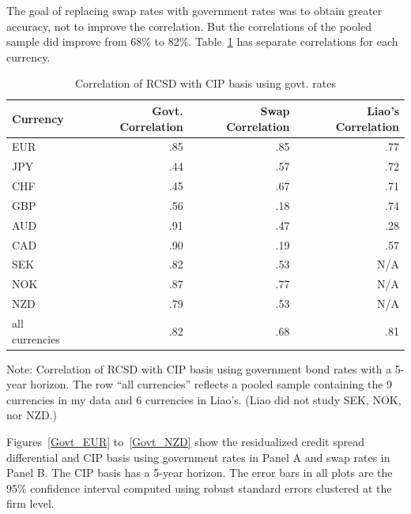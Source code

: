 The goal of replacing swap rates with government rates was to obtain greater accuracy, not to improve the correlation.  But the correlations of the pooled sample did improve from 68\% to 82\%.   Table~\ref{govt_correl_table} has separate correlations for each currency.  


\begin{table}[H]
\caption{\label{govt_correl_table} Correlation of RCSD with CIP basis using govt. rates}
\centering
\begin{tabular}{ |l|r|r|r| }
\hline
Currency & Govt. Correlation & Swap Correlation & Liao's Correlation \\
\hline
EUR & .85 & .85 & .77 \\
JPY & .44 & .57 & .72 \\
CHF & .45 & .67 & .71 \\
GBP & .56 & .18 & .74 \\
AUD & .91 & .47 & .28 \\
CAD & .90 & .19 & .57 \\
SEK & .82 & .53 & N/A \\
NOK & .87 & .77 & N/A \\
NZD & .79 & .53 & N/A \\
all currencies & .82 & .68 & .81 \\  %
\hline
\end{tabular}

\raggedright 
 Note: {\small Correlation of RCSD with CIP basis using government bond rates with a 5-year horizon.  The row ``all currencies'' reflects a pooled sample containing the 9 currencies in my data and 6 currencies in Liao's.  (Liao did not study SEK, NOK, nor NZD.)}
\end{table}


Figures~\ref{Govt_EUR} to~\ref{Govt_NZD} show the residualized credit spread differential and CIP basis using government rates in Panel A and swap rates in Panel B.  The CIP basis has a 5-year horizon.  The error bars in all plots are the 95\% confidence interval computed using robust standard errors clustered at the firm level.


